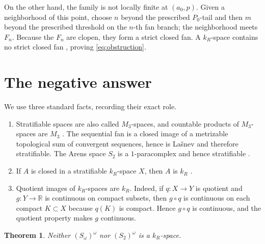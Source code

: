 \documentclass[11pt]{article}
\newtheorem{theorem}{Theorem}
\begin{document}
On the other hand, the family is not locally finite at $(a_0,p)$.  Given a
neighborhood of this point, choose $n$ beyond the prescribed $P_0$-tail
and then $m$ beyond the prescribed threshold on the $n$-th fan branch;
the neighborhood meets $F_n$.  Because the $F_n$ are clopen, they form a
strict closed fan.  A $k_R$-space contains no strict closed fan
\cite[Lemma~3.2]{LLL}, proving \eqref{eq:obstruction}.

\section{The negative answer}

We use three standard facts, recording their exact role.

\begin{enumerate}
\item Stratifiable spaces are also called $M_3$-spaces, and countable
products of $M_3$-spaces are $M_3$ \cite[Thm.~2.4]{Ceder}.
The sequential fan is a closed image of a metrizable topological sum of
convergent sequences, hence is La\v{s}nev and therefore stratifiable.  The
Arens space $S_2$ is a $1$-paracomplex and hence stratifiable
\cite[Thm.~2.2 and introduction]{Kim}.

\item If $A$ is closed in a stratifiable $k_R$-space $X$, then $A$
is $k_R$ \cite[Prop.~5.11]{BG}.

\item Quotient images of $k_R$-spaces are $k_R$.  Indeed, if
$q:X\to Y$ is quotient and $g:Y\to\mathbb R$ is continuous on compact
subsets, then $g\circ q$ is continuous on each compact $K\subset X$
because $q(K)$ is compact.  Hence $g\circ q$ is continuous, and the
quotient property makes $g$ continuous.
\end{enumerate}

\begin{theorem}\label{thm:main}
Neither $(S_\omega)^\omega$ nor $(S_2)^\omega$ is a $k_R$-space.
\end{theorem}
\end{document}
